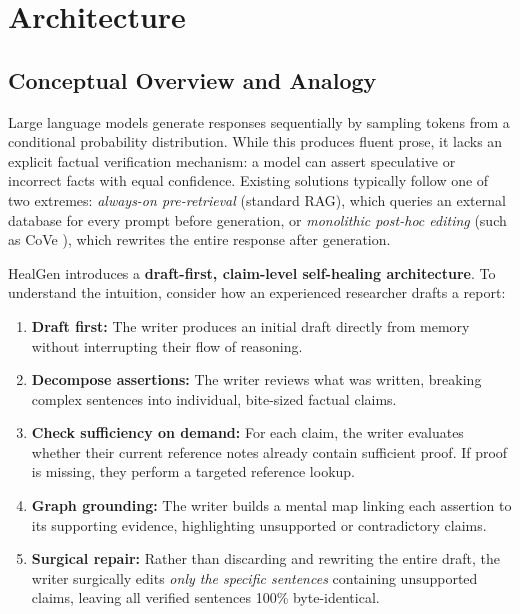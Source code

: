 
\section{Architecture}
\label{sec:architecture}

\subsection{Conceptual Overview and Analogy}
Large language models generate responses sequentially by sampling tokens from a conditional probability distribution. While this produces fluent prose, it lacks an explicit factual verification mechanism: a model can assert speculative or incorrect facts with equal confidence. Existing solutions typically follow one of two extremes: \emph{always-on pre-retrieval} (standard RAG), which queries an external database for every prompt before generation, or \emph{monolithic post-hoc editing} (such as CoVe \cite{dhuliawala2023cove}), which rewrites the entire response after generation.

HealGen introduces a \textbf{draft-first, claim-level self-healing architecture}. To understand the intuition, consider how an experienced researcher drafts a report:
\begin{enumerate}
  \item \textbf{Draft first:} The writer produces an initial draft directly from memory without interrupting their flow of reasoning.
  \item \textbf{Decompose assertions:} The writer reviews what was written, breaking complex sentences into individual, bite-sized factual claims.
  \item \textbf{Check sufficiency on demand:} For each claim, the writer evaluates whether their current reference notes already contain sufficient proof. If proof is missing, they perform a targeted reference lookup.
  \item \textbf{Graph grounding:} The writer builds a mental map linking each assertion to its supporting evidence, highlighting unsupported or contradictory claims.
  \item \textbf{Surgical repair:} Rather than discarding and rewriting the entire draft, the writer surgically edits \emph{only the specific sentences} containing unsupported claims, leaving all verified sentences 100\% byte-identical.
\end{enumerate}

